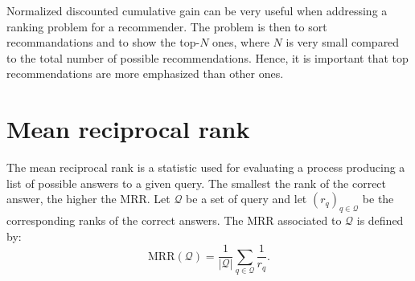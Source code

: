 \documentclass[a4paper]{article}
\begin{document}
Normalized discounted cumulative gain can be very useful when addressing a
ranking problem for a recommender. The problem is then to sort recommandations
and to show the top-$N$ ones, where $N$ is very small compared to the total
number of possible recommendations. Hence, it is important that top 
recommendations are more emphasized than other ones.

\section{Mean reciprocal rank}
The mean reciprocal rank is a statistic used for evaluating a process producing
a list of possible answers to a given query. The smallest the rank of the
correct answer, the higher the MRR. Let $\mathcal{Q}$ be a set of query and let
$\left( r_q \right)_{q \in \mathcal{Q}}$ be the corresponding ranks of the
correct answers. The MRR associated to $\mathcal{Q}$ is defined by:
\[
  \mathrm{MRR}(\mathcal{Q}) = \frac{1}{|\mathcal{Q}|}
  \sum_{q \in \mathcal{Q}} \frac{1}{r_q}.
\]
\end{document}
